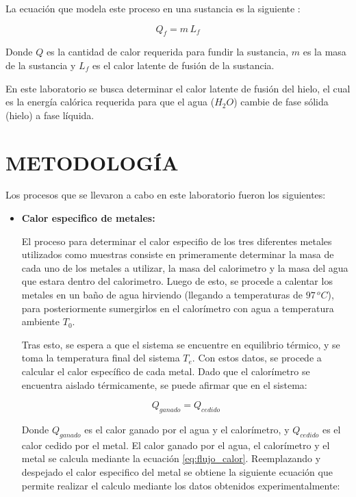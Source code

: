 \documentclass[10pt]{article}
\begin{document}
\begin{multicols*}{2}
    La ecuación que modela este proceso en una sustancia es la siguiente
    \cite{calorLatente}:

    \begin{equation}
        Q_f = m \, L_f
        \label{eq:calor_latente}
    \end{equation}

    Donde $Q$ es la cantidad de calor requerida para fundir la sustancia, $m$ es la
    masa de la sustancia y $L_f$ es el calor latente de fusión de la sustancia.

    En este laboratorio se busca determinar el calor latente de fusión del hielo,
    el cual es la energía calórica requerida para que el agua ($H_2O$) cambie de
    fase sólida (hielo) a fase líquida.

    \section{\small METODOLOGÍA}
    Los procesos que se llevaron a cabo en este laboratorio fueron los siguientes:

    \begin{itemize}
        \item \textbf{Calor especifico de metales:}

              El proceso para determinar el calor especifio de los tres diferentes metales
              utilizados como muestras consiste en primeramente determinar la masa de cada
              uno de los metales a utilizar, la masa del calorimetro y la masa del agua que
              estara dentro del calorimetro. Luego de esto, se procede a calentar los metales
              en un baño de agua hirviendo (llegando a temperaturas de $97 \, ^oC$), para
              posteriormente sumergirlos en el calorímetro con agua a temperatura ambiente
              $T_0$.

              Tras esto, se espera a que el sistema se encuentre en equilibrio térmico, y se
              toma la temperatura final del sistema $T_e$. Con estos datos, se procede a
              calcular el calor específico de cada metal. Dado que el calorímetro se
              encuentra aislado térmicamente, se puede afirmar que en el sistema:

              \begin{equation}
                  Q_{ganado} = Q_{cedido}
                  \label{eq:relacion_calor}
              \end{equation}

              Donde $Q_{ganado}$ es el calor ganado por el agua y el calorímetro, y
              $Q_{cedido}$ es el calor cedido por el metal. El calor ganado por el agua, el
              calorímetro y el metal se calcula mediante la ecuación \ref{eq:flujo_calor}.
              Reemplazando y despejado el calor especifico del metal se obtiene la siguiente
              ecuación que permite realizar el calculo mediante los datos obtenidos
              experimentalmente:


\end{itemize}
\end{multicols*}
\end{document}
